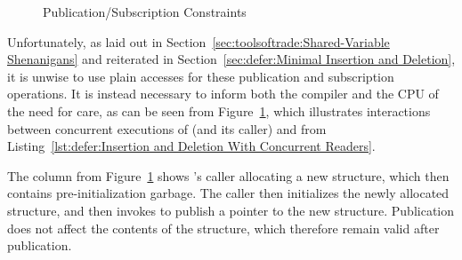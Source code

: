 \begin{figure}[tbp]
\centering
{}
\caption{Publication/Subscription Constraints}
\label{fig:defer:Publication/Subscription Constraints}
\end{figure}

Unfortunately, as laid out in
Section~\ref{sec:toolsoftrade:Shared-Variable Shenanigans}
and reiterated in
Section~\ref{sec:defer:Minimal Insertion and Deletion},
it is unwise to use plain accesses for these publication and subscription
operations.
It is instead necessary to inform both the compiler and the CPU
of the need for care, as can be seen from
Figure~\ref{fig:defer:Publication/Subscription Constraints},
which illustrates interactions between concurrent executions of
 (and its caller) and  from
Listing~\ref{lst:defer:Insertion and Deletion With Concurrent Readers}.

The  column from
Figure~\ref{fig:defer:Publication/Subscription Constraints}
shows 's caller allocating a new  structure,
which then contains pre-initialization garbage.
The caller then initializes the newly allocated structure, and then
invokes  to publish a pointer to the new 
structure.
Publication does not affect the contents of the structure, which
therefore remain valid after publication.

